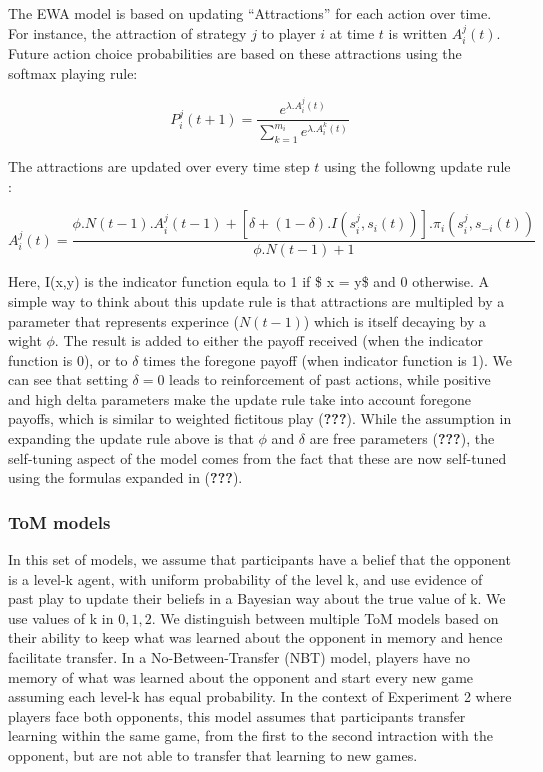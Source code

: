 \documentclass[man,floatsintext]{apa6}
\begin{document}
The EWA model is based on updating \enquote{Attractions} for each action over time. For instance, the attraction of strategy \(j\) to player \(i\) at time \(t\) is written \(A_{i}^{j}(t)\). Future action choice probabilities are based on these attractions using the softmax playing rule:

\[P_{i}^{j}(t+1) = \frac{e^{\lambda . A_{i}^{j}(t)}}{\sum_{k=1}^{m_{i}}e^{\lambda . A_{i}^{k}(t)}} \]

The attractions are updated over every time step \(t\) using the followng update rule :

\[ A_{i}^{j}(t) =  \frac{\phi . N(t-1) . A_{i}^{j}(t-1) + [ \delta + (1-\delta) . I(s_{i}^{j},s_{i}(t))] . \pi_{i}(s_{i}^{j},s_{-i}(t)) } {\phi . N(t-1) + 1} \]

Here, I(x,y) is the indicator function equla to 1 if \$ x = y\$ and 0 otherwise. A simple way to think about this update rule is that attractions are multipled by a parameter that represents experince (\(N(t-1)\)) which is itself decaying by a wight \(\phi\). The result is added to either the payoff received (when the indicator function is 0), or to \(\delta\) times the foregone payoff (when indicator function is 1). We can see that setting \(\delta = 0\) leads to reinforcement of past actions, while positive and high delta parameters make the update rule take into account foregone payoffs, which is similar to weighted fictitous play ({\textbf{???}}).
While the assumption in expanding the update rule above is that \(\phi\) and \(\delta\) are free parameters ({\textbf{???}}), the self-tuning aspect of the model comes from the fact that these are now self-tuned using the formulas expanded in ({\textbf{???}}).

\hypertarget{tom-models}{%
\subsubsection{ToM models}\label{tom-models}}

In this set of models, we assume that participants have a belief that the opponent is a level-k agent, with uniform probability of the level k, and use evidence of past play to update their beliefs in a Bayesian way about the true value of k. We use values of k in \({0,1,2}\). We distinguish between multiple ToM models based on their ability to keep what was learned about the opponent in memory and hence facilitate transfer. In a No-Between-Transfer (NBT) model, players have no memory of what was learned about the opponent and start every new game assuming each level-k has equal probability. In the context of Experiment 2 where players face both opponents, this model assumes that participants transfer learning within the same game, from the first to the second intraction with the opponent, but are not able to transfer that learning to new games.
\end{document}

